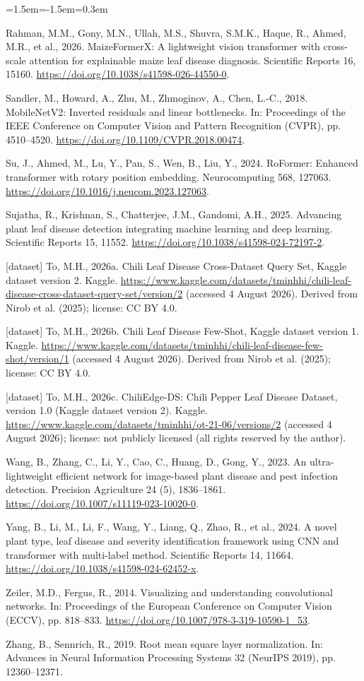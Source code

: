 \begin{list}{}{\leftmargin=1.5em\itemindent=-1.5em\itemsep=0.3em}
\item Rahman, M.M., Gony, M.N., Ullah, M.S., Shuvra, S.M.K., Haque, R., Ahmed, M.R., et al., 2026. MaizeFormerX: A lightweight vision transformer with cross-scale attention for explainable maize leaf disease diagnosis. Scientific Reports 16, 15160. \url{https://doi.org/10.1038/s41598-026-44550-0}.
\item Sandler, M., Howard, A., Zhu, M., Zhmoginov, A., Chen, L.-C., 2018. MobileNetV2: Inverted residuals and linear bottlenecks. In: Proceedings of the IEEE Conference on Computer Vision and Pattern Recognition (CVPR), pp. 4510--4520. \url{https://doi.org/10.1109/CVPR.2018.00474}.
\item Su, J., Ahmed, M., Lu, Y., Pan, S., Wen, B., Liu, Y., 2024. RoFormer: Enhanced transformer with rotary position embedding. Neurocomputing 568, 127063. \url{https://doi.org/10.1016/j.neucom.2023.127063}.
\item Sujatha, R., Krishnan, S., Chatterjee, J.M., Gandomi, A.H., 2025. Advancing plant leaf disease detection integrating machine learning and deep learning. Scientific Reports 15, 11552. \url{https://doi.org/10.1038/s41598-024-72197-2}.
\item {[}dataset{]} To, M.H., 2026a. Chili Leaf Disease Cross-Dataset Query Set, Kaggle dataset version 2. Kaggle. \url{https://www.kaggle.com/datasets/tminhhi/chili-leaf-disease-cross-dataset-query-set/version/2} (accessed 4 August 2026). Derived from Nirob et al. (2025); license: CC BY 4.0.
\item {[}dataset{]} To, M.H., 2026b. Chili Leaf Disease Few-Shot, Kaggle dataset version 1. Kaggle. \url{https://www.kaggle.com/datasets/tminhhi/chili-leaf-disease-few-shot/version/1} (accessed 4 August 2026). Derived from Nirob et al. (2025); license: CC BY 4.0.
\item {[}dataset{]} To, M.H., 2026c. ChiliEdge-DS: Chili Pepper Leaf Disease Dataset, version 1.0 (Kaggle dataset version 2). Kaggle. \url{https://www.kaggle.com/datasets/tminhhi/ot-21-06/versions/2} (accessed 4 August 2026); license: not publicly licensed (all rights reserved by the author).
\item Wang, B., Zhang, C., Li, Y., Cao, C., Huang, D., Gong, Y., 2023. An ultra-lightweight efficient network for image-based plant disease and pest infection detection. Precision Agriculture 24 (5), 1836--1861. \url{https://doi.org/10.1007/s11119-023-10020-0}.
\item Yang, B., Li, M., Li, F., Wang, Y., Liang, Q., Zhao, R., et al., 2024. A novel plant type, leaf disease and severity identification framework using CNN and transformer with multi-label method. Scientific Reports 14, 11664. \url{https://doi.org/10.1038/s41598-024-62452-x}.
\item Zeiler, M.D., Fergus, R., 2014. Visualizing and understanding convolutional networks. In: Proceedings of the European Conference on Computer Vision (ECCV), pp. 818--833. \url{https://doi.org/10.1007/978-3-319-10590-1_53}.
\item Zhang, B., Sennrich, R., 2019. Root mean square layer normalization. In: Advances in Neural Information Processing Systems 32 (NeurIPS 2019), pp. 12360--12371.
\end{list}
